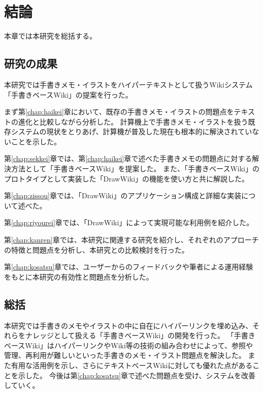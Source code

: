 \chapter{結論}
\label{chap:ketsuron}

本章では本研究を総括する。

\newpage

\section{研究の成果}
本研究では手書きメモ・イラストをハイパーテキストとして扱うWikiシステム「手書きベースWiki」の提案を行った。

まず第\ref{chap:haikei}章において、既存の手書きメモ・イラストの問題点をテキストの進化と比較しながら分析した。
計算機上で手書きメモ・イラストを扱う既存システムの現状をとりあげ、計算機が普及した現在も根本的に解決されていないことを示した。

第\ref{chap:sekkei}章では、第\ref{chap:haikei}章で述べた手書きメモの問題点に対する解決方法として「手書きベースWiki」を提案した。
また、「手書きベースWiki」のプロトタイプとして実装した「DrawWiki」の機能を使い方と共に解説した。

第\ref{chap:zissou}章では、「DrawWiki」のアプリケーション構成と詳細な実装について述べた。

第\ref{chap:riyourei}章では、「DrawWiki」によって実現可能な利用例を紹介した。

第\ref{chap:kanren}章では、本研究に関連する研究を紹介し、それぞれのアプローチの特徴と問題点を分析し、本研究との比較検討を行った。

第\ref{chap:kosatsu}章では、ユーザーからのフィードバックや筆者による運用経験をもとに本研究の有効性と問題点を分析した。

\section{総括}
本研究では手書きのメモやイラストの中に自在にハイパーリンクを埋め込み、それらをナレッジとして扱える「手書きベースWiki」の開発を行った。
「手書きベースWiki」はハイパーリンクやWiki等の技術の組み合わせによって、参照や管理、再利用が難しいといった手書きのメモ・イラスト問題点を解決した。
また有用な活用例を示し、さらにテキストベースWikiに対しても優れた点があることを示した。
今後は第\ref{chap:kosatsu}章で述べた問題点を受け、システムを改善していく。